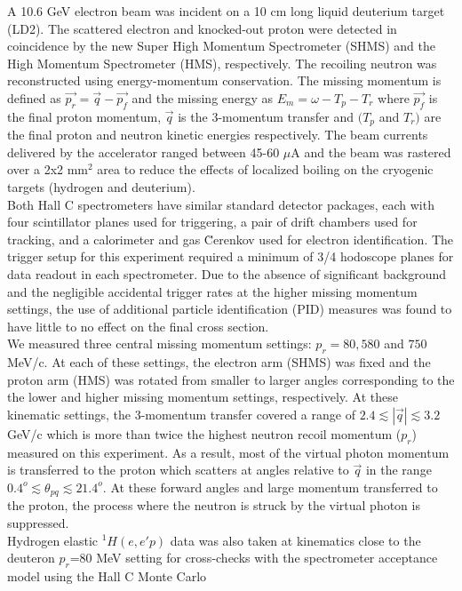 \indent A 10.6 GeV electron beam was incident on a 10 cm long liquid deuterium target (LD2). The scattered electron and knocked-out proton were detected in coincidence
by the new Super High Momentum Spectrometer (SHMS) and the High Momentum Spectrometer (HMS), respectively. The recoiling neutron was reconstructed using energy-momentum conservation. The missing momentum is defined as 
$\vec{p_{r}} = \vec{q} - \vec{p_{f}}$ and the missing  energy as $E_{m} = \omega - T_{p} - T_{r}$ where $\vec{p_{f}}$ is the final proton momentum, $\vec{q}$ is the 3-momentum transfer and $(T_{p}$ and $T_{r})$ are the
final proton and neutron kinetic energies respectively. The beam currents delivered by the accelerator ranged between 45-60 $\mu$A and the beam was rastered over a 2x2 mm$^{2}$ area to reduce the effects of localized boiling on the cryogenic targets (hydrogen and deuterium).\\
\indent Both Hall C spectrometers have similar standard detector packages, each with four scintillator planes\cite{hodo_techreport} used for triggering, a pair of drift chambers\cite{dc_techreport} used for tracking, and a calorimeter\cite{Mkrtchyan_2013} and gas \u{C}erenkov \cite{Li_Wenliang_mthesis,ngc_techreport} used for electron identification.
The trigger setup for this experiment required a minimum of 3/4 hodoscope planes for data readout in each spectrometer. Due to the absence of significant background and the negligible
accidental trigger rates at the higher missing momentum settings, the use of additional particle identification (PID) measures was found to have little to no effect on the final cross section.\\
\indent We measured three central missing momentum settings: $p_{r}=80,580$ and $750$ MeV/c. At each of these settings, the electron arm (SHMS) was fixed and the proton arm (HMS) was rotated from smaller to larger angles corresponding to the
the lower and higher missing momentum settings, respectively. At these kinematic settings, the 3-momentum transfer covered a range of $2.4\lesssim|\vec{q}|\lesssim3.2$ GeV/c which is more than twice the highest neutron recoil momentum ($p_{r}$)
measured on this experiment. As a result, most of the virtual photon momentum is transferred to the proton which scatters at angles relative to $\vec{q}$ in the range $0.4^{o}\lesssim \theta_{pq}\lesssim21.4^{o}$.
At these forward angles and large momentum transferred to the proton, the  process where the neutron is struck by the virtual photon is suppressed.\\
\indent Hydrogen elastic $^{1}H(e,e'p)$ data was also taken at kinematics close to the deuteron $p_{r}$=80 MeV setting for cross-checks with the spectrometer acceptance model using the  Hall C Monte Carlo
